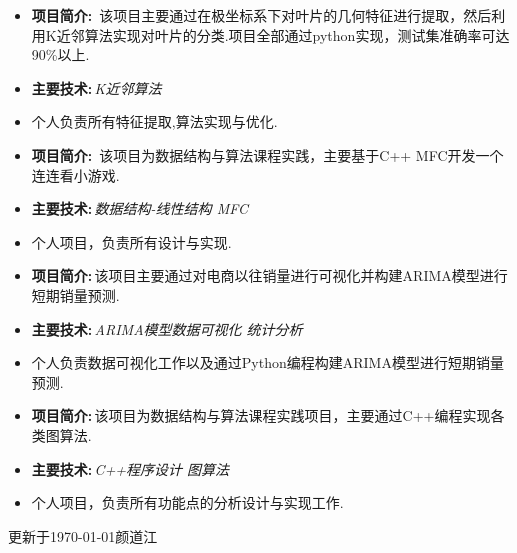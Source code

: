 \documentclass[10pt,a4paper,ragged2e]{altacv}
\begin{document}
\divider

\begin{itemize}
\item\textbf{项目简介:\,} 该项目主要通过在极坐标系下对叶片的几何特征进行提取，然后利用K近邻算法实现对叶片的分类.项目全部通过python实现，测试集准确率可达90\%以上.
\item \textbf{主要技术:\,}\emph{K近邻算法}
\item 个人负责所有特征提取,算法实现与优化.
\end{itemize}

\divider

\begin{itemize}
	\item\textbf{项目简介:\,} 该项目为数据结构与算法课程实践，主要基于C++ MFC开发一个连连看小游戏.
	\item \textbf{主要技术:\,}\emph{数据结构-线性结构 \quad MFC}
	\item 个人项目，负责所有设计与实现.
\end{itemize}

\clearpage

\begin{itemize}
\item\textbf{项目简介:\,}该项目主要通过对电商以往销量进行可视化并构建ARIMA模型进行短期销量预测.
\item \textbf{主要技术:\,}\emph{ARIMA模型\quad 数据可视化 \quad 统计分析}
\item 个人负责数据可视化工作以及通过Python编程构建ARIMA模型进行短期销量预测.
\end{itemize}

\divider

\begin{itemize}
\item\textbf{项目简介:\,}该项目为数据结构与算法课程实践项目，主要通过C++编程实现各类图算法.
\item \textbf{主要技术:\,}\emph{C++程序设计 \quad 图算法}
\item 个人项目，负责所有功能点的分析设计与实现工作.
\end{itemize}

\divider



\begin{flushright}
	\tiny{更新于\today \qquad 颜道江}
\end{flushright}

\clearpage
\end{document}
